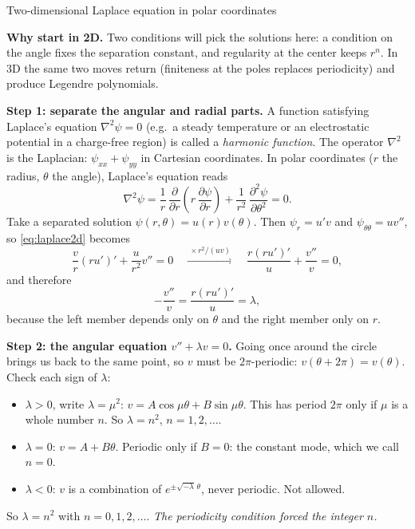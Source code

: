 \documentclass[11pt]{beamer}
\begin{document}
\begin{frame}[allowframebreaks=1.00]{Two-dimensional Laplace equation in polar coordinates}
\footnotesize

\textbf{Why start in 2D.} Two conditions will pick the solutions here: a condition on the
angle fixes the separation constant, and regularity at the center keeps $r^n$. In 3D the same
two moves return (finiteness at the poles replaces periodicity) and produce Legendre polynomials.

\textbf{Step 1: separate the angular and radial parts.}  A function satisfying Laplace's equation $\nabla^2\psi=0$ (e.g.\ a steady temperature or an electrostatic potential in a charge-free region) is called a \emph{harmonic
function}. The operator $\nabla^2$ is the Laplacian: $\psi_{xx}+\psi_{yy}$ in
Cartesian coordinates. In polar coordinates ($r$ the radius, $\theta$ the angle), Laplace's
equation reads
\begin{equation}
  \nabla^2\psi
   = \frac{1}{r}\,\frac{\partial}{\partial r}\left(r\,\frac{\partial\psi}{\partial r}\right)
   + \frac{1}{r^2}\,\frac{\partial^2\psi}{\partial\theta^2} = 0.
  \label{eq:laplace2d}
\end{equation}
Take a separated solution $\psi(r,\theta)=u(r)v(\theta)$. Then $\psi_r=u'v$ and
$\psi_{\theta\theta}=uv''$, so \eqref{eq:laplace2d} becomes
\[
  \frac{v}{r}\left(ru'\right)'+\frac{u}{r^2}v''=0
  \quad\xrightarrow{\ \times r^2/(uv)\ }\quad
  \frac{r(ru')'}{u}+\frac{v''}{v}=0,
\]
and therefore
\begin{equation}
  -\frac{v''}{v}=\frac{r(ru')'}{u}=\lambda,
  \label{eq:laplace2d-separation}
\end{equation}
because the left member depends only on $\theta$ and the right member only on $r$.

\par\framebreak\par
\textbf{Step 2: the angular equation \(v''+\lambda v=0\).} Going once around the circle brings us back to
the same point, so \(v\) must be \(2\pi\)-periodic: \(v(\theta+2\pi)=v(\theta)\). Check each sign of \(\lambda\):
\begin{itemize}
  \item \(\lambda>0\), write \(\lambda=\mu^2\): \(v=A\cos\mu\theta+B\sin\mu\theta\). This has period \(2\pi\) only if \(\mu\) is a
        whole number \(n\). So \(\lambda=n^2\), \(n=1,2,\dots\).
  \item \(\lambda=0\): \(v=A+B\theta\). Periodic only if \(B=0\): the constant mode, which we call \(n=0\).
  \item \(\lambda<0\): \(v\) is a combination of \(e^{\pm\sqrt{-\lambda}\,\theta}\), never periodic. Not allowed.
\end{itemize}
So \(\lambda=n^2\) with \(n=0,1,2,\ldots\). \emph{The periodicity condition forced the integer \(n\).}


\end{frame}
\end{document}
